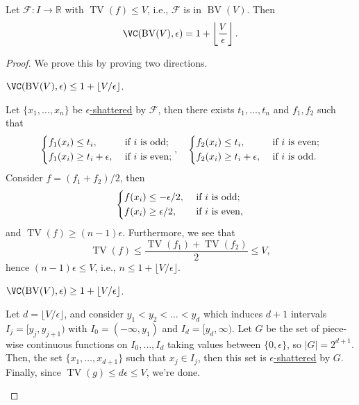 \begin{lemma}
	Let \(\mathscr{F} \colon I \to \mathbb{R} \) with \(\mathop{\mathrm{TV}}(f) \leq V\), i.e., \(\mathscr{F} \) is in \(\mathop{\mathrm{BV}}(V) \). Then
	\[
		\VC(\mathop{\mathrm{BV}}(V) , \epsilon ) = 1 + \left\lfloor \frac{V}{\epsilon } \right\rfloor.
	\]
\end{lemma}
\begin{proof}
	We prove this by proving two directions.
	\begin{claim}
		\(\VC(\mathop{\mathrm{BV}}(V) , \epsilon ) \leq 1 + \lfloor V / \epsilon \rfloor\).
	\end{claim}
	\begin{explanation}
		Let \(\{ x_1, \dots , x_n \} \) be \hyperref[def:eps-shattered]{\(\epsilon\)-shattered} by \(\mathscr{F} \), then there exists \(t_1, \dots , t_n\) and \(f_1, f_2\) such that
		\[
			\begin{dcases}
				f_1(x_i) \leq t_i,             & \text{ if \(i\) is odd} ;  \\
				f_1(x_i) \geq t_i + \epsilon , & \text{ if \(i\) is even} ;
			\end{dcases},\quad
			\begin{dcases}
				f_2(x_i) \leq t_i,             & \text{ if \(i\) is even} ; \\
				f_2(x_i) \geq t_i + \epsilon , & \text{ if \(i\) is odd} .
			\end{dcases}
		\]
		Consider \(f = (f_1 + f_2) / 2\), then
		\[
			\begin{dcases}
				f(x_i) \leq - \epsilon / 2, & \text{ if \(i\) is odd} ;  \\
				f(x_i) \geq \epsilon / 2 ,  & \text{ if \(i\) is even} ,
			\end{dcases}
		\]
		and \(\mathop{\mathrm{TV}}(f) \geq (n-1) \epsilon \). Furthermore, we see that
		\[
			\mathop{\mathrm{TV}}(f) \leq \frac{\mathop{\mathrm{TV}}(f_1) + \mathop{\mathrm{TV}}(f_2) }{2} \leq V,
		\]
		hence \((n-1) \epsilon \leq V\), i.e., \(n \leq 1 + \lfloor V / \epsilon  \rfloor\).
	\end{explanation}

	\begin{claim}
		\(\VC(\mathop{\mathrm{BV}}(V) , \epsilon ) \geq 1 + \lfloor V / \epsilon \rfloor\).
	\end{claim}
	\begin{explanation}
		Let \(d = \lfloor V / \epsilon \rfloor\), and consider \(y_1 < y_2 < \dots < y_d\) which induces \(d+1\) intervals \(I_j = [y_j, y_{j+1})\) with \(I_0 = (-\infty , y_1)\) and \(I_d = [y_d, \infty )\). Let \(G\) be the set of piece-wise continuous functions on \(I_0, \dots , I_d\) taking values between \(\{ 0, \epsilon  \} \), so \(\vert G \vert = 2^{d+1}\). Then, the set \(\{ x_1, \dots , x_{d+1} \} \) such that \(x_j \in I_j\), then this set is \hyperref[def:eps-shattered]{\(\epsilon\)-shattered} by \(G\). Finally, since \(\mathop{\mathrm{TV}}(g) \leq d\epsilon \leq V\), we're done.
	\end{explanation}
\end{proof}

